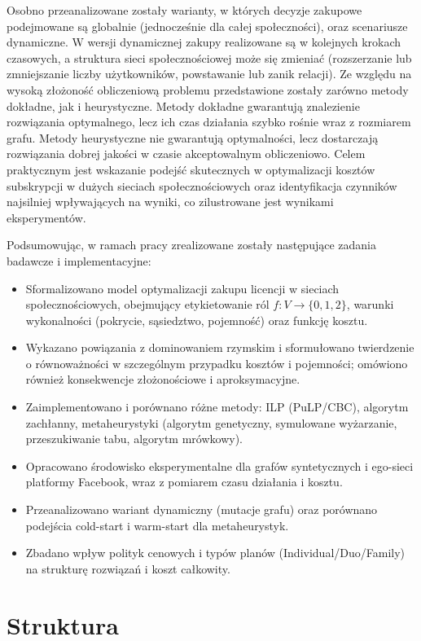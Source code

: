 Osobno przeanalizowane zostały warianty, w których decyzje zakupowe podejmowane są globalnie (jednocześnie dla całej społeczności), oraz scenariusze dynamiczne. W wersji dynamicznej zakupy realizowane są w kolejnych krokach czasowych, a struktura sieci społecznościowej może się zmieniać (rozszerzanie lub zmniejszanie liczby użytkowników, powstawanie lub zanik relacji). Ze względu na wysoką złożoność obliczeniową problemu przedstawione zostały zarówno metody dokładne, jak i heurystyczne. Metody dokładne gwarantują znalezienie rozwiązania optymalnego, lecz ich czas działania szybko rośnie wraz z rozmiarem grafu. Metody heurystyczne nie gwarantują optymalności, lecz dostarczają rozwiązania dobrej jakości w czasie akceptowalnym obliczeniowo. Celem praktycznym jest wskazanie podejść skutecznych w optymalizacji kosztów subskrypcji w dużych sieciach społecznościowych oraz identyfikacja czynników najsilniej wpływających na wyniki, co zilustrowane jest wynikami eksperymentów.

Podsumowując, w ramach pracy zrealizowane zostały następujące zadania badawcze i implementacyjne:
\begin{itemize}
  \item Sformalizowano model optymalizacji zakupu licencji w sieciach społecznościowych, obejmujący etykietowanie ról $f:V\to\{0,1,2\}$, warunki wykonalności (pokrycie, sąsiedztwo, pojemność) oraz funkcję kosztu.
  \item Wykazano powiązania z dominowaniem rzymskim i sformułowano twierdzenie o równoważności w szczególnym przypadku kosztów i pojemności; omówiono również konsekwencje złożonościowe i aproksymacyjne.
  \item Zaimplementowano i porównano różne metody: ILP (PuLP/CBC), algorytm zachłanny, metaheurystyki (algorytm genetyczny, symulowane wyżarzanie, przeszukiwanie tabu, algorytm mrówkowy).
  \item Opracowano środowisko eksperymentalne dla grafów syntetycznych i ego-sieci platformy Facebook, wraz z pomiarem czasu działania i kosztu.
  \item Przeanalizowano wariant dynamiczny (mutacje grafu) oraz porównano podejścia cold-start i warm-start dla metaheurystyk.
  \item Zbadano wpływ polityk cenowych i typów planów (Individual/Duo/Family) na strukturę rozwiązań i koszt całkowity.
\end{itemize}

\section{Struktura}

